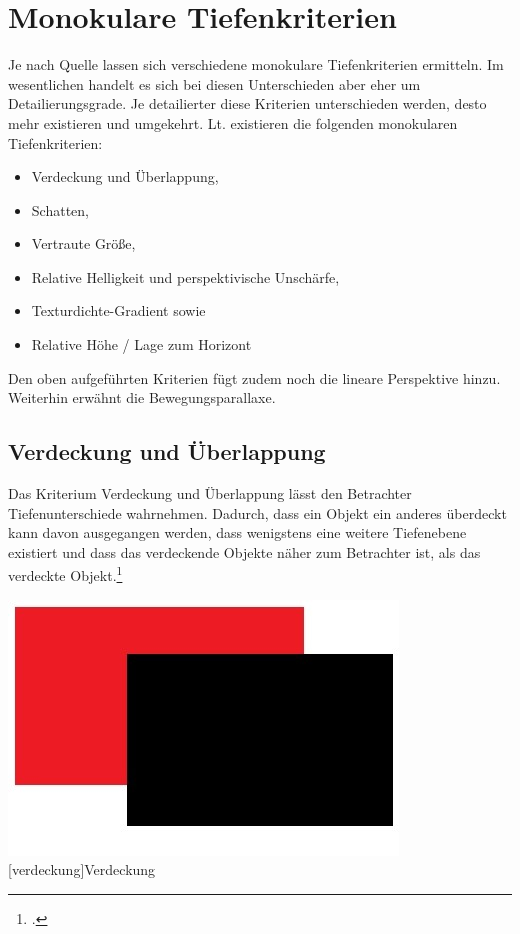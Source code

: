 \section{Monokulare Tiefenkriterien}
Je nach Quelle lassen sich verschiedene monokulare Tiefenkriterien ermitteln. Im wesentlichen handelt es sich bei diesen Unterschieden aber eher um Detailierungsgrade. Je detailierter diese Kriterien unterschieden werden, desto mehr existieren und umgekehrt. Lt. \cite{heidXX} existieren die folgenden monokularen Tiefenkriterien:

\begin{itemize}
\item Verdeckung und Überlappung,
\item Schatten,
\item Vertraute Größe,
\item Relative Helligkeit und perspektivische Unschärfe,
\item Texturdichte-Gradient sowie
\item Relative Höhe / Lage zum Horizont
\end{itemize}

Den oben aufgeführten Kriterien fügt \cite{leyh10} zudem noch die lineare Perspektive hinzu. Weiterhin erwähnt \cite{Gras16} die Bewegungsparallaxe.

\subsection{Verdeckung und Überlappung}
Das Kriterium Verdeckung und Überlappung lässt den Betrachter Tiefenunterschiede wahrnehmen. Dadurch, dass ein Objekt ein anderes überdeckt kann davon ausgegangen werden, dass wenigstens eine weitere Tiefenebene existiert und dass das verdeckende Objekte näher zum Betrachter ist, als das verdeckte Objekt.\footcite[Vgl.]{heidXX}

\vspace{1em}
\begin{minipage}{\linewidth}
	\centering
	\includegraphics[width=0.7\linewidth]{images/verdeckung.jpg}
	[verdeckung]{Verdeckung}
	\label{fig:verdeckung}
\end{minipage}
\vspace{1em} 

